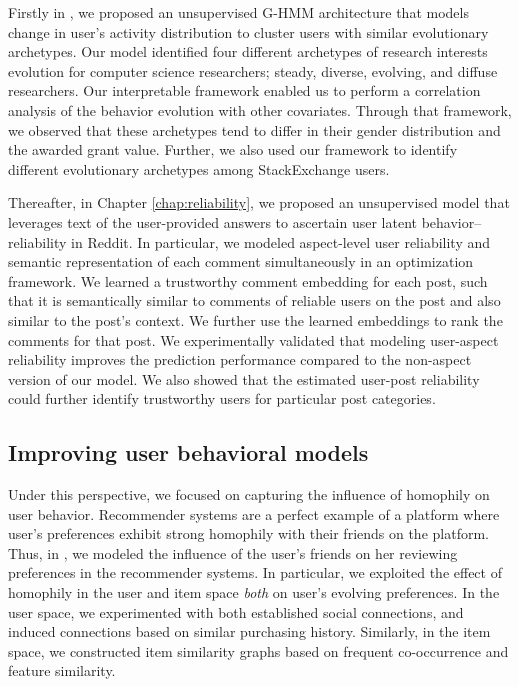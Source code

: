 Firstly in , we proposed an unsupervised G-HMM architecture that models change in user's activity distribution to cluster users with similar evolutionary archetypes.
Our model identified four different archetypes of research interests evolution for computer science researchers; steady, diverse, evolving, and diffuse researchers. Our interpretable framework enabled us to perform a correlation analysis of the behavior evolution with other covariates. Through that framework, we observed that these archetypes tend to differ in their gender distribution and the awarded grant value. Further, we also used our framework to identify different evolutionary archetypes among StackExchange users.

Thereafter, in Chapter \ref{chap:reliability}, we proposed an unsupervised model that leverages text of the user-provided answers to ascertain user latent behavior--reliability in Reddit. In particular, we modeled aspect-level user reliability and semantic representation of each comment simultaneously in an optimization framework.
We learned a trustworthy comment embedding for each post, such that it is semantically similar to comments of reliable users on the post and also similar to the post's context. We further use the learned embeddings to rank the comments for that post.
We experimentally validated that modeling user-aspect reliability improves the prediction performance compared to the non-aspect version of our model. We also showed that the estimated user-post reliability could further identify trustworthy users for particular post categories.

\subsection{Improving user behavioral models}
Under this perspective, we focused on capturing the influence of homophily on user behavior. Recommender systems are a perfect example of a platform where user's preferences exhibit strong homophily with their friends on the platform. Thus, in , we modeled the influence of the user's friends on her reviewing preferences in the recommender systems. In particular, we exploited the effect of homophily in the user and item space \emph{both} on user's evolving preferences. In the user space, we experimented with both established social connections, and induced connections based on similar purchasing history. Similarly, in the item space, we constructed item similarity graphs based on frequent co-occurrence and feature similarity.

